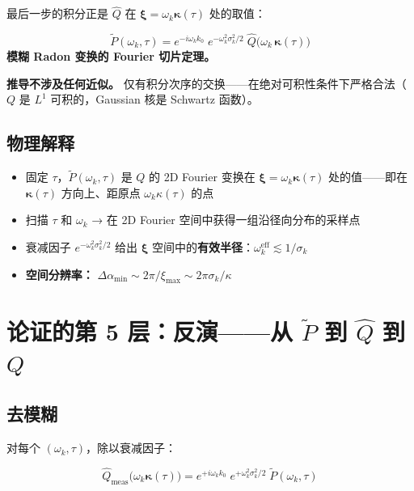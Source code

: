 \documentclass[12pt,a4paper]{ctexart}
\begin{document}
最后一步的积分正是 $\hat{Q}$ 在 $\boldsymbol{\xi} = \omega_k\boldsymbol{\kappa}(\tau)$ 处的取值：

\begin{keybox}
\[
\boxed{\tilde{P}(\omega_k,\tau)
= e^{-i\omega_k k_0}\;
e^{-\omega_k^2\sigma_k^2/2}\;
\hat{Q}\!\bigl(\omega_k\,\boldsymbol{\kappa}(\tau)\bigr)}
\]
\textbf{模糊 Radon 变换的 Fourier 切片定理。}
\end{keybox}

\textbf{推导不涉及任何近似。} 仅有积分次序的交换——在绝对可积性条件下严格合法（$Q$ 是 $L^1$ 可积的，Gaussian 核是 Schwartz 函数）。

\subsection{物理解释}

\begin{itemize}[nosep]
  \item 固定 $\tau$，$\tilde{P}(\omega_k,\tau)$ 是 $Q$ 的 2D Fourier 变换在 $\boldsymbol{\xi} = \omega_k\boldsymbol{\kappa}(\tau)$ 处的值——即在 $\boldsymbol{\kappa}(\tau)$ 方向上、距原点 $\omega_k\kappa(\tau)$ 的点
  \item 扫描 $\tau$ 和 $\omega_k$ → 在 2D Fourier 空间中获得一组沿径向分布的采样点
  \item 衰减因子 $e^{-\omega_k^2\sigma_k^2/2}$ 给出 $\boldsymbol{\xi}$ 空间中的\textbf{有效半径}：$\omega_k^{\text{eff}} \lesssim 1/\sigma_k$
  \item \textbf{空间分辨率：} $\Delta\alpha_{\min} \sim 2\pi/\xi_{\max} \sim 2\pi\sigma_k/\kappa$
\end{itemize}

\section{论证的第 5 层：反演——从 $\tilde{P}$ 到 $\hat{Q}$ 到 $Q$}

\subsection{去模糊}

对每个 $(\omega_k,\tau)$，除以衰减因子：

\begin{equation}\label{eq:deblur}
\hat{Q}_{\text{meas}}\bigl(\omega_k\boldsymbol{\kappa}(\tau)\bigr)
= e^{+i\omega_k k_0}\;
e^{+\omega_k^2\sigma_k^2/2}\;
\tilde{P}(\omega_k,\tau)
\end{equation}
\end{document}
